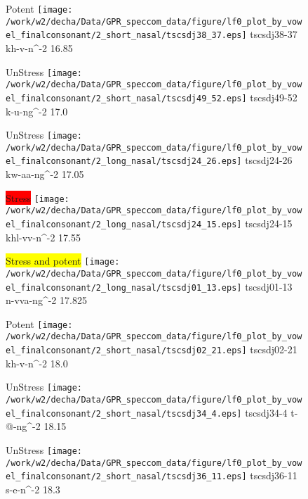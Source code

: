 \documentclass{article}
\begin{document}
\begin{figure}[t]
\begin{minipage}[b]{.24\textwidth}
\colorbox{Apricot}{Potent}
\centering
\texttt{[image: /work/w2/decha/Data/GPR\_speccom\_data/figure/lf0\_plot\_by\_vowel\_finalconsonant/2\_short\_nasal/tscsdj38\_37.eps]}
tscsdj38-37 kh-v-n\textasciicircum-2 16.85
\end{minipage}
\begin{minipage}[b]{.24\textwidth}
UnStress
\centering
\texttt{[image: /work/w2/decha/Data/GPR\_speccom\_data/figure/lf0\_plot\_by\_vowel\_finalconsonant/2\_short\_nasal/tscsdj49\_52.eps]}
tscsdj49-52 k-u-ng\textasciicircum-2 17.0
\end{minipage}
\begin{minipage}[b]{.24\textwidth}
UnStress
\centering
\texttt{[image: /work/w2/decha/Data/GPR\_speccom\_data/figure/lf0\_plot\_by\_vowel\_finalconsonant/2\_long\_nasal/tscsdj24\_26.eps]}
tscsdj24-26 kw-aa-ng\textasciicircum-2 17.05
\end{minipage}
\begin{minipage}[b]{.24\textwidth}
\colorbox{red}{Stress}
\centering
\texttt{[image: /work/w2/decha/Data/GPR\_speccom\_data/figure/lf0\_plot\_by\_vowel\_finalconsonant/2\_long\_nasal/tscsdj24\_15.eps]}
tscsdj24-15 khl-vv-n\textasciicircum-2 17.55
\end{minipage}
\end{figure}
\clearpage
\begin{figure}[t]
\begin{minipage}[b]{.24\textwidth}
\colorbox{yellow}{Stress and potent}
\centering
\texttt{[image: /work/w2/decha/Data/GPR\_speccom\_data/figure/lf0\_plot\_by\_vowel\_finalconsonant/2\_long\_nasal/tscsdj01\_13.eps]}
tscsdj01-13 n-vva-ng\textasciicircum-2 17.825
\end{minipage}
\begin{minipage}[b]{.24\textwidth}
\colorbox{Apricot}{Potent}
\centering
\texttt{[image: /work/w2/decha/Data/GPR\_speccom\_data/figure/lf0\_plot\_by\_vowel\_finalconsonant/2\_short\_nasal/tscsdj02\_21.eps]}
tscsdj02-21 kh-v-n\textasciicircum-2 18.0
\end{minipage}
\begin{minipage}[b]{.24\textwidth}
UnStress
\centering
\texttt{[image: /work/w2/decha/Data/GPR\_speccom\_data/figure/lf0\_plot\_by\_vowel\_finalconsonant/2\_short\_nasal/tscsdj34\_4.eps]}
tscsdj34-4 t-@-ng\textasciicircum-2 18.15
\end{minipage}
\begin{minipage}[b]{.24\textwidth}
UnStress
\centering
\texttt{[image: /work/w2/decha/Data/GPR\_speccom\_data/figure/lf0\_plot\_by\_vowel\_finalconsonant/2\_short\_nasal/tscsdj36\_11.eps]}
tscsdj36-11 s-e-n\textasciicircum-2 18.3
\end{minipage}
\end{figure}
\end{document}
